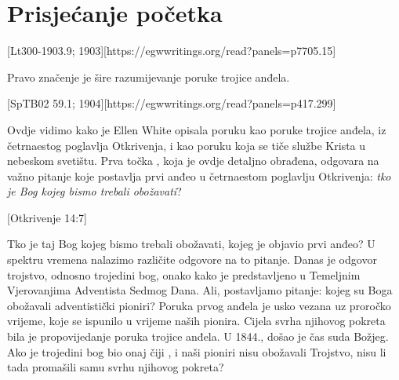 \chapter{Prisjećanje početka} \label{chap:remembering-the-beginning}

[Lt300-1903.9; 1903][https://egwwritings.org/read?panels=p7705.15]

Pravo značenje  je šire razumijevanje poruke trojice anđela.

[SpTB02 59.1; 1904][https://egwwritings.org/read?panels=p417.299]

Ovdje vidimo kako je Ellen White opisala poruku  kao poruke trojice anđela, iz četrnaestog poglavlja Otkrivenja, i kao poruku koja se tiče službe Krista u nebeskom svetištu. Prva točka , koja je ovdje detaljno obrađena, odgovara na važno pitanje koje postavlja prvi anđeo u četrnaestom poglavlju Otkrivenja: \textit{tko je Bog kojeg bismo trebali obožavati}?

[Otkrivenje 14:7]

Tko je taj Bog kojeg bismo trebali obožavati, kojeg je objavio prvi anđeo? U spektru vremena nalazimo različite odgovore na to pitanje. Danas je odgovor trojstvo, odnosno trojedini bog, onako kako je predstavljeno u Temeljnim Vjerovanjima Adventista Sedmog Dana. Ali, postavljamo pitanje: kojeg su Boga obožavali adventistički pioniri? Poruka prvog anđela je usko vezana uz proročko vrijeme, koje se ispunilo u vrijeme naših pionira. Cijela svrha njihovog pokreta bila je propovijedanje poruka trojice anđela. U 1844., došao je čas suda Božjeg. Ako je trojedini bog bio onaj čiji , i naši pioniri nisu obožavali Trojstvo, nisu li tada promašili samu svrhu njihovog pokreta?

